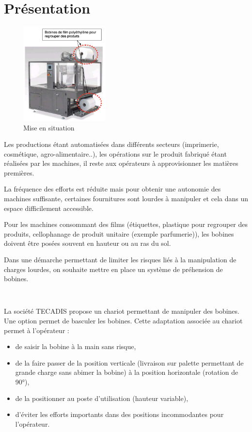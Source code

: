 

\section{Présentation}

\begin{figure}
	\vspace{-1.8cm}
  \begin{center}
    \includegraphics[width=0.4\textwidth]{img/fig01}
  \end{center}
  \caption{Mise en situation}
\label{fig01}
\end{figure}

Les productions étant automatisées dans différents secteurs (imprimerie, cosmétique, agro-alimentaire..), les opérations sur le produit fabriqué étant réalisées par les machines, il reste aux opérateurs à approvisionner les matières premières.

La fréquence des efforts est réduite mais pour obtenir une autonomie des machines suffisante, certaines fournitures sont lourdes à manipuler et cela dans un espace difficilement accessible. 

Pour les machines consommant des films (étiquettes, plastique pour regrouper des produits, cellophanage de produit unitaire (exemple parfumerie)), les bobines doivent être posées souvent en hauteur ou au ras du sol. 

Dans une démarche permettant de limiter les risques liés à la manipulation de charges lourdes, on souhaite mettre en place un système de préhension de bobines.

~\

La société TECADIS propose un chariot permettant de manipuler des bobines. 
Une option permet de basculer les bobines. Cette adaptation associée au chariot permet à l'opérateur : 
\begin{itemize}
 \item de saisir la bobine à la main sans risque,
 \item de la faire passer de la position verticale (livraison sur palette permettant de grande charge sans abimer la bobine) à la position horizontale (rotation de 90°),
 \item de la positionner au poste d'utilisation (hauteur variable),
 \item d'éviter les efforts importants dans des positions incommodantes pour l'opérateur. 
\end{itemize}

